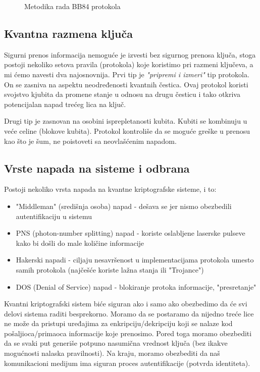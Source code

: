 \documentclass[a4paper]{article}
\begin{document}
{\begin{figure}[h]
\caption{Metodika rada BB84 protokola}
\label{slike:prva}
\end{figure}
\subsection{Kvantna razmena ključa}
Sigurni prenos informacija nemoguće je izvesti bez sigurnog prenosa ključa, stoga postoji nekoliko setova pravila (protokola) koje koristimo pri razmeni ključeva, a mi ćemo navesti dva najosnovnija.\newpage
Prvi tip je \emph{"pripremi i izmeri"} tip protokola. On se zasniva na aspektu neodređenosti kvantnih čestica. Ovaj protokol koristi svojstvo kjubita da promene stanje u odnosu na drugu česticu i tako otkriva potencijalan napad trećeg lica na ključ.

Drugi tip je zasnovan na osobini isprepletanosti kubita. Kubiti se kombinuju u veće celine (blokove kubita). Protokol kontroliše da se moguće greške u prenosu kao što je šum, ne poistoveti sa neovlašćenim napadom.
\smallskip
\subsection{Vrste napada na sisteme i odbrana}
Postoji nekoliko vrsta napada na kvantne kriptografske sisteme, i to:
\begin{itemize}
\item "Middleman" (središnja osoba) napad - dešava se jer nismo obezbedili autentifikaciju u sistemu
\item PNS (photon-number splitting) napad - koriste oslabljene laserske pulseve kako bi došli do male količine informacije
\item Hakerski napadi - ciljaju nesavršenost u implementacijama
protokola umesto samih protokola (najčešće koriste lažna stanja ili "Trojance")
\item DOS (Denial of Service) napad - blokiranje protoka informacije, "presretanje"
\end{itemize}
Kvantni kriptografski sistem biće siguran ako i samo ako obezbedimo da će svi delovi sistema raditi besprekorno. Moramo da se postaramo da nijedno treće lice ne može da pristupi uređajima za enkripciju/dekripciju koji se nalaze kod pošaljioca/primaoca informacije koje prenosimo. Pored toga moramo obezbediti da se svaki put generiše potpuno nasumična vrednost ključa (bez ikakve mogućnosti nalaska pravilnosti).  Na kraju, moramo obezbediti da naš komunikacioni medijum ima siguran proces autentifikacije (potvrda identiteta).

}
\end{document}
